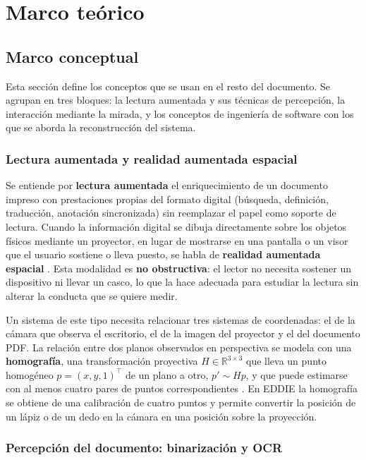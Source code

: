 \chapter{Marco teórico}
\label{cap:marco}

\section{Marco conceptual}

Esta sección define los conceptos que se usan en el resto del documento. Se agrupan en tres bloques: la lectura aumentada y sus técnicas de percepción, la interacción mediante la mirada, y los conceptos de ingeniería de software con los que se aborda la reconstrucción del sistema.

\subsection{Lectura aumentada y realidad aumentada espacial}

Se entiende por \textbf{lectura aumentada} el enriquecimiento de un documento impreso con prestaciones propias del formato digital (búsqueda, definición, traducción, anotación sincronizada) sin reemplazar el papel como soporte de lectura. Cuando la información digital se dibuja directamente sobre los objetos físicos mediante un proyector, en lugar de mostrarse en una pantalla o un visor que el usuario sostiene o lleva puesto, se habla de \textbf{realidad aumentada espacial} \citep{bimber2005}. Esta modalidad es \textbf{no obstructiva}: el lector no necesita sostener un dispositivo ni llevar un casco, lo que la hace adecuada para estudiar la lectura sin alterar la conducta que se quiere medir.

Un sistema de este tipo necesita relacionar tres sistemas de coordenadas: el de la cámara que observa el escritorio, el de la imagen del proyector y el del documento PDF. La relación entre dos planos observados en perspectiva se modela con una \textbf{homografía}, una transformación proyectiva $H \in \mathbb{R}^{3\times3}$ que lleva un punto homogéneo $p=(x,y,1)^\top$ de un plano a otro, $p' \sim Hp$, y que puede estimarse con al menos cuatro pares de puntos correspondientes \citep{hartley2004}. En EDDIE la homografía se obtiene de una calibración de cuatro puntos y permite convertir la posición de un lápiz o de un dedo en la cámara en una posición sobre la proyección.

\subsection{Percepción del documento: binarización y OCR}

